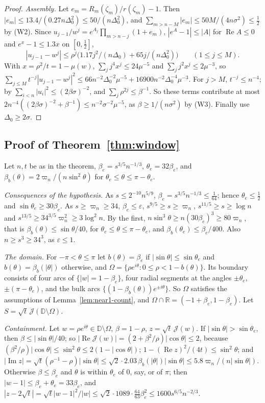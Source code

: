 \documentclass[11pt]{amsart}
\theoremstyle{definition}
\theoremstyle{remark}
\numberwithin{equation}{section}
\newcommand{\R}{\mathbb{R}}
\newcommand{\D}{\mathbb{D}}
\newcommand{\eps}{\varepsilon}
\DeclareMathOperator{\re}{Re}
\DeclareMathOperator{\im}{Im}
\begin{document}
\begin{proof}
\emph{Assembly.} Let $e_m=R_m(\zeta_m)/r(\zeta_m)-1$. Then $|e_m|\le13.4/(0.27n\Delta_0^2)\le50/(n\Delta_0^2)$, and $\sum_{m>n-M}|e_m|\le50M/(4n\sigma^2)\le\frac12$ by (W2). Since $u_{j-1}/w^j=e^{A_j}\prod_{m>n-j}(1+e_m)$, $|e^A-1|\le|A|$ for $\re A\le0$ and $e^x-1\le1.3x$ on $[0,\frac12]$,
\[
|u_{j-1}-w^j|\le\rho^j\bigl(1.17j^2/(n\Delta_0)+65j/(n\Delta_0^2)\bigr)\qquad(1\le j\le M).
\]
With $x=\rho^2/t=1-\mu(w)$, $\sum_jj^4x^j\le24\mu^{-5}$ and $\sum_jj^2x^j\le2\mu^{-3}$, so $\sum_{j\le M}t^{-j}|u_{j-1}-w^j|^2\le66n^{-2}\Delta_0^{-2}\mu^{-5}+16900n^{-2}\Delta_0^{-4}\mu^{-3}$. For $j>M$, $t^{-j}\le n^{-4}$; by \cite[Lemma~\ref{M-lem:resolvent}]{Main} $\sum_{i<n}|u_i|^2\le(2\beta\sigma)^{-2}$, and $\sum_j\rho^{2j}\le\beta^{-1}$. So these terms contribute at most $2n^{-4}((2\beta\sigma)^{-2}+\beta^{-1})\le n^{-2}\sigma^{-2}\mu^{-5}$, as $\beta\ge1/(n\sigma^2)$ by (W3). Finally use $\Delta_0\ge2\sigma$.
\end{proof}

\subsection{Proof of Theorem~\ref{thm:window}}
Let $n,t$ be as in the theorem, $\beta_e=s^{3/5}n^{-1/3}$, $\theta_e=32\beta_e$, and $\beta_b(\theta)=2\varpi_n/(n\sin^2\theta)$ for $\theta_e\le\theta\le\pi-\theta_e$.

\emph{Consequences of the hypothesis.} As $s\le2^{-10}n^{5/9}$, $\beta_e=s^{3/5}n^{-1/3}\le\frac1{64}$; hence $\theta_e\le\frac12$ and $\sin\theta_e\ge30\beta_e$. As $s\ge\varpi_n\ge34$, $\beta_e\le\eps$, $s^{9/5}\ge s\ge\varpi_n$, $s^{11/5}\ge s\ge\log n$ and $s^{13/5}\ge34^{3/5}\varpi_n^2\ge3\log^2n$. By the first, $n\sin^3\theta\ge n(30\beta_e)^3\ge80\varpi_n$, that is $\beta_b(\theta)\le\sin\theta/40$, for $\theta_e\le\theta\le\pi-\theta_e$, and $\beta_b(\theta_e)\le\beta_e/400$. Also $n\ge s^3\ge34^3$, as $\eps\le1$.

\emph{The domain.} For $-\pi<\theta\le\pi$ let $b(\theta)=\beta_e$ if $|\sin\theta|\le\sin\theta_e$ and $b(\theta)=\beta_b(|\theta|)$ otherwise, and $\Omega=\{\rho e^{i\theta}:0\le\rho<1-b(\theta)\}$. Its boundary consists of four arcs of $\{|w|=1-\beta_e\}$, four radial segments at the angles $\pm\theta_e$, $\pm(\pi-\theta_e)$, and the bulk arcs $\{(1-\beta_b(\theta))e^{\pm i\theta}\}$. So $\Omega$ satisfies the assumptions of Lemma~\ref{lem:near1-count}, and $\Omega\cap\R=(-1+\beta_e,1-\beta_e)$. Let $S=\sqrt t\,\mathcal J(\D\setminus\Omega)$.

\emph{Containment.} Let $w=\rho e^{i\theta}\in\D\setminus\Omega$, $\beta=1-\rho$, $z=\sqrt t\,\mathcal J(w)$. If $|\sin\theta|>\sin\theta_e$, then $\beta\le|\sin\theta|/40$; so $|\re\mathcal J(w)|=(2+\beta^2/\rho)|\cos\theta|\le2$, because $(\beta^2/\rho)|\cos\theta|\le\sin^2\theta\le2(1-|\cos\theta|)$; $1-(\re z)^2/(4t)\le\sin^2\theta$; and $|\im z|=\sqrt t(\rho^{-1}-\rho)|\sin\theta|\le\sqrt2\cdot2.03\,\beta_b(|\theta|)|\sin\theta|\le5.8\varpi_n/(n|\sin\theta|)$. Otherwise $\beta\le\beta_e$ and $\theta$ is within $\theta_e$ of $0$, say, or of $\pi$; then $|w-1|\le\beta_e+\theta_e=33\beta_e$, and $|z-2\sqrt t|=\sqrt t|w-1|^2/|w|\le\sqrt2\cdot1089\cdot\frac{64}{63}\beta_e^2\le1600s^{6/5}n^{-2/3}$.
\end{document}

